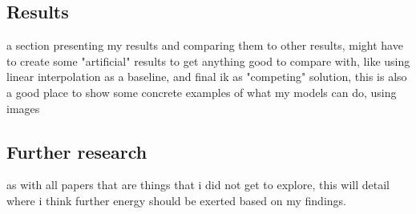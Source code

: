 \subsection{Results}\label{subsec:results}
a section presenting my results and comparing them to other results, might have to create some "artificial" results
to get anything good to compare with, like using linear interpolation as a baseline, and final ik as "competing"
solution, this is also a good place to show some concrete examples of what my models can do, using images

\subsection{Further research}\label{subsec:further-research}
as with all papers that are things that i did not get to explore, this will detail where i think further energy should
be exerted based on my findings.